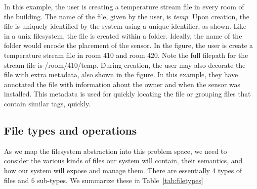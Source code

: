 In this example, the user is creating a temperature stream file in every room of the building.  The name of the file, given by the user,
is \emph{temp}.  Upon creation, the file is uniquely identified by the system using a unique identifier, as shown.  Like in a unix filesystem, the
file is created within a folder.  Ideally, the name of the folder would encode the placement of the sensor.  In the figure, the 
user is create a temperature stream file in room 410 and room 420.  Note the full filepath for the stream file is /room/410/temp.
During creation, the user may also decorate the file with extra metadata, also shown in the figure.  In this example, they have annotated
the file with information about the owner and when the sensor was installed.   This metadata is used for quickly locating the file
or grouping files that contain similar tags, quickly.

\subsection{File types and operations}
As we map the filesystem abstraction into this problem space, we need to consider the various kinds of files our system will contain,
their semantics, and how our system will expose and manage them.  There are essentially 4 types of files and 6 sub-types.  We summarize
these in Table~\ref{tab:filetypes}




